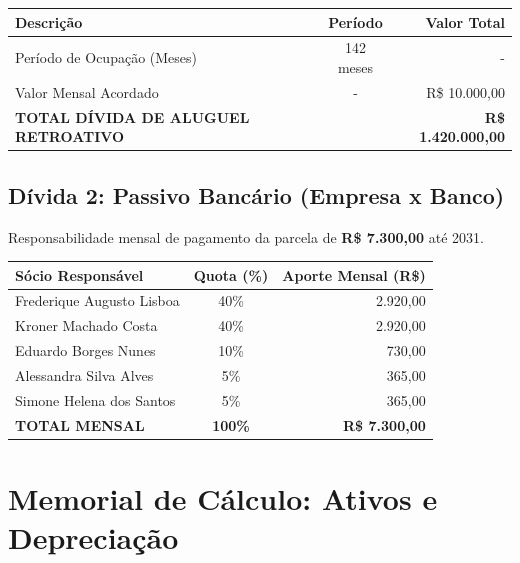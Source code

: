 \documentclass[12pt, a4paper]{article}
\newcommand{\reais}[1]{R\$ #1}
\begin{document}
\begin{table}[h!]
    \centering
    \small
    \begin{tabularx}{\textwidth}{X c r}
        \toprule
        \textbf{Descrição} & \textbf{Período} & \textbf{Valor Total} \\
        \midrule
        Período de Ocupação (Meses) & 142 meses & - \\
        Valor Mensal Acordado & - & \reais{10.000,00} \\
        \midrule
        \rowcolor{accentColor!10} \textbf{TOTAL DÍVIDA DE ALUGUEL RETROATIVO} & & \textbf{\reais{1.420.000,00}} \\
        \bottomrule
    \end{tabularx}
\end{table}
\newpage

\subsection{Dívida 2: Passivo Bancário (Empresa x Banco)}
Responsabilidade mensal de pagamento da parcela de \textbf{\reais{7.300,00}} até 2031.

\begin{table}[h!]
    \centering
    \small
    \begin{tabularx}{\textwidth}{X c r}
        \toprule
        \textbf{Sócio Responsável} & \textbf{Quota (\%)} & \textbf{Aporte Mensal (R\$)} \\
        \midrule
        Frederique Augusto Lisboa & 40\% & 2.920,00 \\
        Kroner Machado Costa & 40\% & 2.920,00 \\
        Eduardo Borges Nunes & 10\% & 730,00 \\
        Alessandra Silva Alves & 5\% & 365,00 \\
        Simone Helena dos Santos & 5\% & 365,00 \\
        \midrule
        \rowcolor{lightGray} \textbf{TOTAL MENSAL} & \textbf{100\%} & \textbf{\reais{7.300,00}} \\
        \bottomrule
    \end{tabularx}
\end{table}

\section{Memorial de Cálculo: Ativos e Depreciação}
\end{document}
